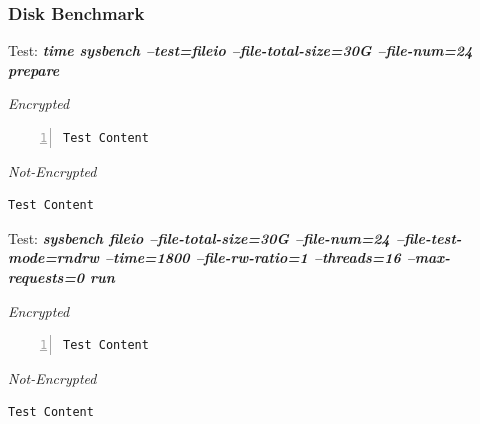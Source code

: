 \newpage
\subsubsection{Disk Benchmark}
\begin{center}
  Test: \textbf{\textit{time sysbench --test=fileio --file-total-size=30G --file-num=24 prepare}}  
\end{center}
\vspace*{-\baselineskip}
\noindent\begin{minipage}[t]{0.45\linewidth}
  \centering
  \textit{Encrypted}
  \lstset{language=bash,label=SliceExaple}
  \begin{lstlisting}[basicstyle=\tiny,frame=single, numbers=left, label=cpu_test1]
  Test Content
  \end{lstlisting}
\end{minipage}
\hspace{0.5cm}
\noindent\begin{minipage}[t]{0.45\linewidth}
  \centering
  \textit{Not-Encrypted}
  \begin{lstlisting}[basicstyle=\tiny,frame=single, label=cpu_test2]
  Test Content
  \end{lstlisting}
\end{minipage}

\newpage
\begin{center}
  Test: \textbf{\textit{sysbench fileio --file-total-size=30G --file-num=24 --file-test-mode=rndrw --time=1800 --file-rw-ratio=1 --threads=16 --max-requests=0 run}}  
\end{center}
\vspace*{-\baselineskip}
\noindent\begin{minipage}[t]{0.45\linewidth}
  \centering
  \textit{Encrypted}
  \lstset{language=bash,label=SliceExaple}
  \begin{lstlisting}[basicstyle=\tiny,frame=single, numbers=left, label=cpu_test1]
  Test Content
  \end{lstlisting}
\end{minipage}
\hspace{0.5cm}
\noindent\begin{minipage}[t]{0.45\linewidth}
  \centering
  \textit{Not-Encrypted}
  \begin{lstlisting}[basicstyle=\tiny,frame=single, label=cpu_test2]
  Test Content
  \end{lstlisting}
\end{minipage}


